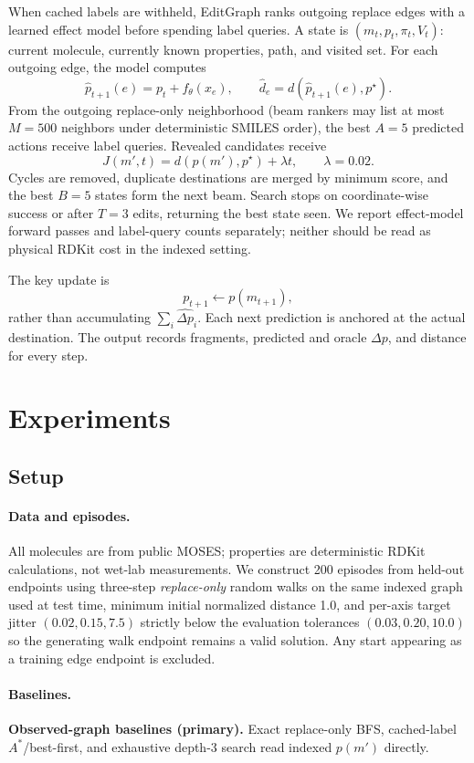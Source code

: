 \documentclass[journal=jcisd8,manuscript=article,email=false]{achemso}
\begin{document}
When cached labels are withheld, EditGraph ranks outgoing replace edges with a learned effect model before spending label queries. A state is $(m_t,p_t,\pi_t,V_t)$: current molecule, currently known properties, path, and visited set. For each outgoing edge, the model computes
\[
\widehat p_{t+1}(e)=p_t+f_\theta(x_e),\qquad
\widehat d_e=d(\widehat p_{t+1}(e),p^\star).
\]
From the outgoing replace-only neighborhood (beam rankers may list at most $M{=}500$ neighbors under deterministic SMILES order), the best $A{=}5$ predicted actions receive label queries. Revealed candidates receive
\[
J(m',t)=d(p(m'),p^\star)+\lambda t,\qquad \lambda=0.02.
\]
Cycles are removed, duplicate destinations are merged by minimum score, and the best $B=5$ states form the next beam. Search stops on coordinate-wise success or after $T=3$ edits, returning the best state seen. We report effect-model forward passes and label-query counts separately; neither should be read as physical RDKit cost in the indexed setting.

The key update is
\[
p_{t+1}\leftarrow p(m_{t+1}),
\]
rather than accumulating $\sum_i\widehat{\Delta p}_i$. Each next prediction is anchored at the actual destination. The output records fragments, predicted and oracle $\Delta p$, and distance for every step.

\section{Experiments}
\label{sec:experiments}

\subsection{Setup}

\paragraph{Data and episodes.}
All molecules are from public MOSES; properties are deterministic RDKit calculations, not wet-lab measurements. We construct 200 episodes from held-out endpoints using three-step \emph{replace-only} random walks on the same indexed graph used at test time, minimum initial normalized distance 1.0, and per-axis target jitter $(0.02,0.15,7.5)$ strictly below the evaluation tolerances $(0.03,0.20,10.0)$ so the generating walk endpoint remains a valid solution. Any start appearing as a training edge endpoint is excluded.

\paragraph{Baselines.}
\textbf{Observed-graph baselines (primary).} Exact replace-only BFS, cached-label $A^\ast$/best-first, and exhaustive depth-3 search read indexed $p(m')$ directly.
\end{document}
